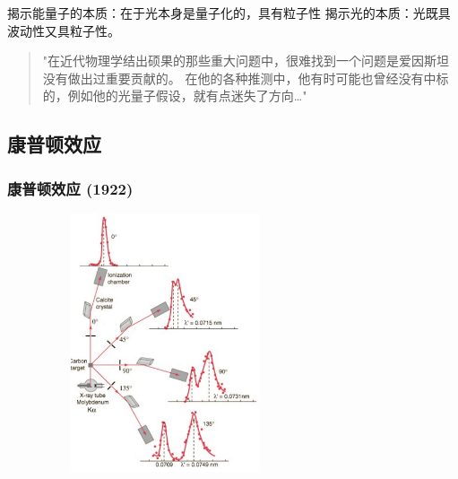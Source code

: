 \begin{frame} 
    \begin{tcolorbox4}[光量子假说的意义]
        \begin{itemize}
            \Item  揭示能量子的本质：在于光本身是量子化的，具有粒子性
            \Item  揭示光的本质：光既具波动性又具粒子性。
        \end{itemize}
    \end{tcolorbox4}
    \begin{quotation}
        "在近代物理学结出硕果的那些重大问题中，很难找到一个问题是爱因斯坦没有做出过重要贡献的。
        在他的各种推测中，他有时可能也曾经没有中标的，例如他的光量子假设，就有点迷失了方向\dots"  \\
    \end{quotation}
\end{frame}

\subsection{康普顿效应}

\begin{frame}   
    \frametitle{康普顿效应 (1922)}
    \begin{center}
        \includegraphics[width=0.7\textwidth, height=3in]{figs/comptonscattering.png}
    \end{center}  
\end{frame}

